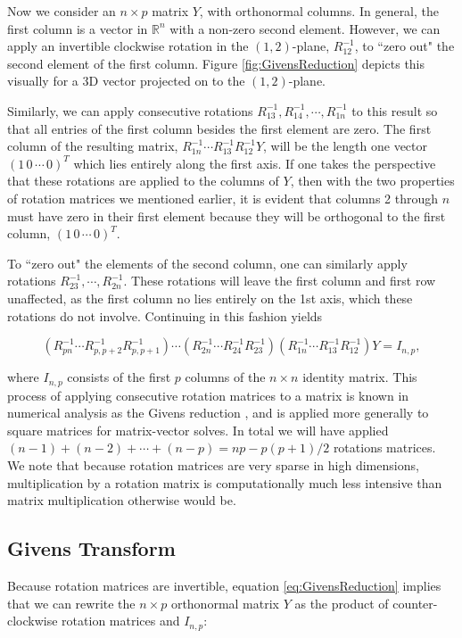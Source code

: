 \documentclass{article}
\begin{document}
Now we consider an $n \times p$ matrix $Y$, with orthonormal columns. In general, the first column is a vector in $\mathbb{R}^n$ with a non-zero second element. However, we can apply an invertible clockwise rotation in the $(1,2)$-plane, $R_{12}^{-1}$, to ``zero out" the second element of the first column. Figure \ref{fig:GivensReduction} depicts this visually for a 3D vector projected on to the $(1,2)$-plane.


Similarly, we can apply consecutive rotations $R_{13}^{-1}, R_{14}^{-1}, \cdots, R_{1n}^{-1}$ to this result so that all entries of the first column besides the first element are zero. The first column of the resulting matrix, $R_{1n}^{-1} \cdots R_{13}^{-1}  R_{12}^{-1}Y$, will be the length one vector $(1 \, 0 \, \cdots \, 0)^T$ which lies entirely along the first axis. If one takes the perspective that these rotations are applied to the columns of $Y$, then with the two properties of rotation matrices we mentioned earlier, it is evident that columns 2 through $n$ must have zero in their first element because they will be orthogonal to the first column, $(1 \, 0 \, \cdots \, 0)^T$.

To ``zero out" the elements of the second column, one can similarly apply rotations $R_{23}^{-1}, \cdots, R_{2n}^{-1}$. These rotations will leave the first column and first row unaffected, as the first column no lies entirely on the 1st axis, which these rotations do not involve. Continuing in this fashion yields

\begin{equation}
\label{eq:GivensReduction}
(R_{pn}^{-1} \cdots R_{p,p+2}^{-1} R_{p,p+1}^{-1}) \cdots (R_{2n}^{-1} \cdots R_{24}^{-1} R_{23}^{-1})(R_{1n}^{-1} \cdots R_{13}^{-1}  R_{12}^{-1})Y = I_{n,p},
\end{equation}

where $I_{n,p}$ consists of the first $p$ columns of the $n \times n$ identity matrix. This process of applying consecutive rotation matrices to a matrix is known in numerical analysis as the Givens reduction \citep{meyer2000matrix}, and is applied more generally to square matrices for matrix-vector solves. In total we will have applied $(n-1)+(n-2)+\cdots+(n-p) = np -p(p+1)/2$ rotations matrices. We note that because rotation matrices are very sparse in high dimensions, multiplication by a rotation matrix is computationally much less intensive than matrix multiplication otherwise would be.

\subsection{Givens Transform}
Because rotation matrices are invertible, equation \ref{eq:GivensReduction} implies that we can rewrite the $n \times p$ orthonormal matrix $Y$ as the product of counter-clockwise rotation matrices and $I_{n,p}$:
\end{document}

